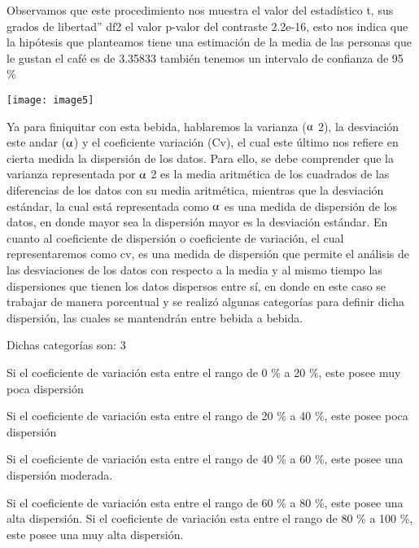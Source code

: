 \documentclass{article} %
\begin{document}
\noindent 

\noindent Observamos que este procedimiento nos muestra el valor del estad\'{i}stico t, sus grados de libertad'' df2 el valor p-valor del contraste 2.2e-16, esto nos indica que la hip\'{o}tesis que planteamos tiene una estimaci\'{o}n de la media de las personas que le gustan el caf\'{e} es de 3.35833 tambi\'{e}n tenemos un intervalo de confianza de 95 \%

\noindent \texttt{[image: image5]}

\noindent 

\noindent  Ya para finiquitar con esta bebida, hablaremos la varianza ($\alphaup$ 2), la desviaci\'{o}n este andar ($\alphaup$) y el coeficiente variaci\'{o}n (Cv), el cual este \'{u}ltimo nos refiere en cierta medida la dispersi\'{o}n de los datos. Para ello, se debe comprender que la varianza representada por $\alphaup$ 2 es la media aritm\'{e}tica de los cuadrados de las diferencias de los datos con su media aritm\'{e}tica, mientras que la desviaci\'{o}n est\'{a}ndar, la cual est\'{a} representada como $\alphaup$ es una medida de dispersi\'{o}n de los datos, en donde mayor sea la dispersi\'{o}n mayor es la desviaci\'{o}n est\'{a}ndar. En cuanto al coeficiente de dispersi\'{o}n o coeficiente de variaci\'{o}n, el cual representaremos como cv, es una medida de dispersi\'{o}n que permite el an\'{a}lisis de las desviaciones de los datos con respecto a la media y al mismo tiempo las dispersiones que tienen los datos dispersos entre s\'{i}, en donde en este caso se trabajar de manera porcentual y se realiz\'{o} algunas categor\'{i}as para definir dicha dispersi\'{o}n, las cuales se mantendr\'{a}n entre bebida a bebida. 

\noindent Dichas categor\'{i}as son: 3 

\noindent  Si el coeficiente de variaci\'{o}n esta entre el rango de 0 \% a 20 \%, este posee muy poca dispersi\'{o}n 

\noindent  Si el coeficiente de variaci\'{o}n esta entre el rango de 20 \% a 40 \%, este posee poca dispersi\'{o}n 

\noindent  Si el coeficiente de variaci\'{o}n esta entre el rango de 40 \% a 60 \%, este posee una dispersi\'{o}n moderada. 

\noindent  Si el coeficiente de variaci\'{o}n esta entre el rango de 60 \% a 80 \%, este posee una alta dispersi\'{o}n.   Si el coeficiente de variaci\'{o}n esta entre el rango de 80 \% a 100 \%, este posee una muy alta dispersi\'{o}n. 
\end{document}
